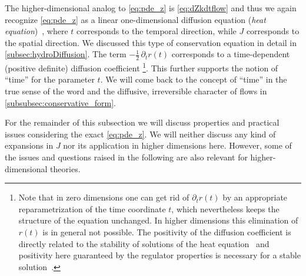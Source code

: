 The higher-dimensional analog to \cref{eq:pde_z} is \cref{eq:dZkdtflow} and thus we again recognize \cref{eq:pde_z} as a linear one-dimensional diffusion equation (\textit{heat equation})~\cite{Rosten:2010vm,SkinnerScript,Salmhofer:2020Talk,Cannon:1984}, where $t$ corresponds to the temporal direction, while $J$ corresponds to the spatial direction.
We discussed this type of conservation equation in detail in \cref{subsec:hydroDiffusion}.
The term $- \tfrac{1}{2} \, \partial_t r ( t )$ corresponds to a time-dependent (positive definite) diffusion coefficient%
\footnote{%
	Note that in zero dimensions one can get rid of $\partial_t r ( t )$ by an appropriate reparametrization of the time coordinate $t$, which nevertheless keeps the structure of the equation unchanged.
	In higher dimensions this elimination of $r ( t )$ is in general not possible.
	The positivity of the diffusion coefficient is directly related to the stability of solutions of the heat equation~\cite{LeVeque:1992,LeVeque:2002} and positivity \dash{} here guaranteed by the regulator properties \dash{} is necessary for a stable solution~\cite{Rosten:2010vm,Osborn:2011kw}.
}.
This further supports the notion of \rg{} ``time'' for the parameter $t$.
We will come back to the concept of \rg{} ``time'' in the true sense of the word and the diffusive, irreversible character of \frg{} flows in \cref{subsubsec:conservative_form}.\bigskip

For the remainder of this subsection we will discuss properties and practical issues considering the exact \pde{} \eqref{eq:pde_z}.
We will neither discuss any kind of expansions in $J$ nor its application in higher dimensions here.
However, some of the issues and questions raised in the following are also relevant for higher-dimensional theories.

